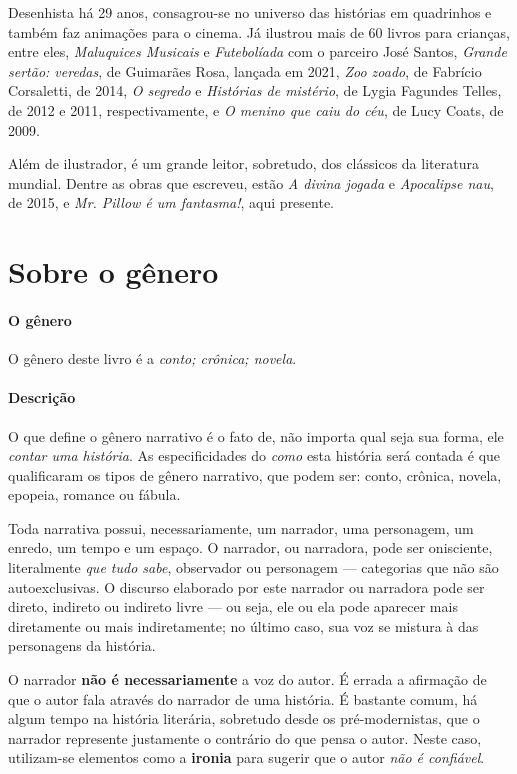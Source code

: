 \documentclass[11pt]{extarticle}
\begin{document}
Desenhista há 29 anos, consagrou-se no universo das histórias em quadrinhos e também faz animações para o cinema. 
Já ilustrou mais de 60 livros para crianças, entre eles, \textit{Maluquices Musicais} e \textit{Futebolíada} com o parceiro José Santos, \textit{Grande sertão: veredas}, de Guimarães Rosa, lançada em 2021,
\textit{Zoo zoado}, de Fabrício Corsaletti, de 2014, \textit{O segredo} e \textit{Histórias de mistério}, de Lygia Fagundes Telles, de 2012 e 2011, respectivamente, e \textit{O menino que caiu do céu}, de Lucy Coats, de 2009.

Além de ilustrador, é um grande leitor, sobretudo, dos clássicos da literatura mundial.
Dentre as obras que escreveu, estão \textit{A divina jogada} e \textit{Apocalipse nau}, de 2015, e \textit{Mr. Pillow é um fantasma!}, aqui presente.


\section{Sobre o gênero}

\paragraph{O gênero} O gênero deste livro é a \textit{conto; crônica; novela}. 

\paragraph{Descrição} O que define o gênero narrativo é o fato de, não importa
qual seja sua forma, ele \textit{contar uma história}.
As especificidades do \textit{como} esta história será contada é que
qualificaram os tipos de gênero narrativo, que podem ser: conto, crônica, novela,
epopeia, romance ou fábula. 

Toda narrativa possui, necessariamente, um narrador, uma personagem, um enredo,
um tempo e um espaço. O narrador, ou narradora, pode ser onisciente, literalmente
\textit{que tudo sabe}, observador ou personagem --- categorias que não são autoexclusivas.
O discurso elaborado por este narrador ou narradora pode ser direto, indireto ou indireto livre 
--- ou seja, ele ou ela pode aparecer mais diretamente ou mais indiretamente; no último caso,
sua voz se mistura à das personagens da história.

O narrador \textbf{não é necessariamente} a voz do autor. É errada a afirmação
de que o autor fala através do narrador de uma história. É bastante comum,
há algum tempo na história literária, sobretudo desde os pré-modernistas, que 
o narrador represente justamente o contrário do que pensa o autor. Neste caso, 
utilizam-se elementos como a \textbf{ironia} para sugerir que o autor \textit{não é confiável}.
\end{document}
